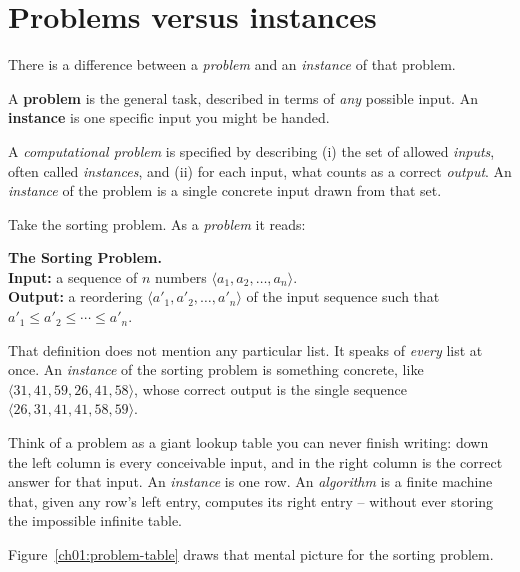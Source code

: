 \section{Problems versus instances}

There is a difference between a \emph{problem} and an \emph{instance} of that problem.

A \textbf{problem} is the general task, described in terms of \emph{any} possible
input. An \textbf{instance} is one specific input you might be handed.

\begin{definition}\label{ch01:problem-instance}
A \emph{computational problem} is specified by describing (i) the set of allowed
\emph{inputs}, often called \emph{instances}, and (ii) for each input, what counts
as a correct \emph{output}. An \emph{instance} of the problem is a single concrete
input drawn from that set.
\end{definition}

Take the sorting problem. As a \emph{problem} it reads:

\begin{formalbox}
\textbf{The Sorting Problem.}\\
\textbf{Input:} a sequence of $n$ numbers $\langle a_1, a_2, \dots, a_n\rangle$.\\
\textbf{Output:} a reordering $\langle a'_1, a'_2, \dots, a'_n\rangle$ of the input
sequence such that $a'_1 \le a'_2 \le \cdots \le a'_n$.
\end{formalbox}

That definition does not mention any particular list. It speaks of \emph{every}
list at once. An \emph{instance} of the sorting problem is something concrete, like
$\langle 31, 41, 59, 26, 41, 58 \rangle$, whose correct output is the single
sequence $\langle 26, 31, 41, 41, 58, 59 \rangle$.

\begin{intuitionbox}
Think of a problem as a giant lookup table you can never finish writing: down the
left column is every conceivable input, and in the right column is the correct
answer for that input. An \emph{instance} is one row. An \emph{algorithm} is a
finite machine that, given any row's left entry, computes its right entry -- without
ever storing the impossible infinite table.
\end{intuitionbox}

Figure~\ref{ch01:problem-table} draws that mental picture for the sorting problem.


